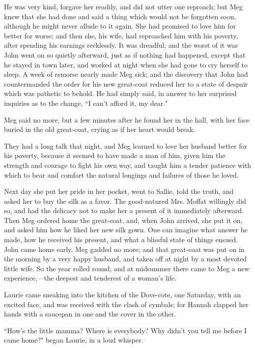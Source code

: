 He was very kind, forgave her readily, and did not utter one reproach;
but Meg knew that she had done and said a thing which would not be
forgotten soon, although he might never allude to it again. She had
promised to love him for better for worse; and then she, his wife, had
reproached him with his poverty, after spending his earnings recklessly.
It was dreadful; and the worst of it was John went on so quietly
afterward, just as if nothing had happened, except that he stayed in
town later, and worked at night when she had gone to cry herself to
sleep. A week of remorse nearly made Meg sick; and the discovery that
John had countermanded the order for his new great-coat reduced her to a
state of despair which was pathetic to behold. He had simply said, in
answer to her surprised inquiries as to the change, ``I
can't afford it, my dear."

Meg said no more, but a few minutes after he found her in the hall, with
her face buried in the old great-coat, crying as if her heart would
break.

They had a long talk that night, and Meg learned to love her husband
better for his poverty, because it seemed to have made a man of him,
given him the strength and courage to fight his own way, and taught him
a tender patience with which to bear and comfort the natural longings
and failures of those he loved.

Next day she put her pride in her pocket, went to Sallie, told the
truth, and asked her to buy the silk as a favor. The good-natured Mrs.
Moffat willingly did so, and had the delicacy not to make her a present
of it immediately afterward. Then Meg ordered home the great-coat, and,
when John arrived, she put it on, and asked him how he liked her new
silk gown. One can imagine what answer he made, how he received his
present, and what a blissful state of things ensued. John came home
early, Meg gadded no more; and that great-coat was put on in the morning
by a very happy husband, and taken off at night by a most devoted little
wife. So the year rolled round, and at midsummer there came to Meg a new
experience,---the deepest and tenderest of a woman's
life.

Laurie came sneaking into the kitchen of the Dove-cote, one Saturday,
with an excited face, and was received with the clash of cymbals; for
Hannah clapped her hands with a saucepan in one and the cover in the
other.

``How's the little mamma? Where is everybody? Why
didn't you tell me before I came home?" began Laurie, in
a loud whisper.

